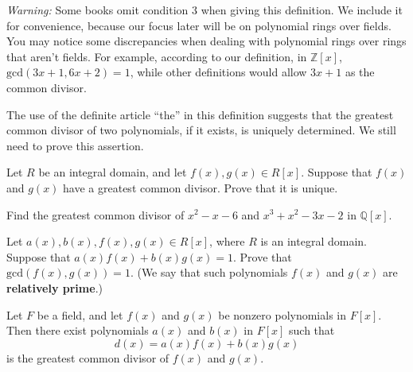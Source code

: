 \emph{Warning:} Some books omit condition 3 when giving this definition. We include it for convenience, because our focus later will be on polynomial rings over fields. You may notice some discrepancies when dealing with polynomial rings over rings that aren't fields. For example, according to our definition, in \(\mathbb{Z}[x]\), \(\text{gcd}(3x+1, 6x+2) = 1\), while other definitions would allow \(3x+1\) as the common divisor.

The use of the definite article ``the'' in this definition suggests that the greatest common divisor of two polynomials, if it exists, is uniquely determined. We still need to prove this assertion.

\begin{problem}
Let \(R\) be an integral domain, and let \(f(x),g(x)\in R[x]\). Suppose that \(f(x)\) and \(g(x)\) have a greatest common divisor.  Prove that it is unique.
\end{problem}

\begin{problem}
Find the greatest common divisor of \(x^2-x-6\) and \(x^3+x^2-3x-2\) in \(\mathbb{Q}[x]\).
\end{problem}

\begin{problem}\label{prob:relprimegcd}
Let \(a(x), b(x), f(x), g(x) \in R[x]\), where \(R\) is an integral domain. Suppose that \(a(x)f(x)+b(x)g(x) = 1\). Prove that \(\mbox{gcd}(f(x),g(x))=1\). (We say that such polynomials \(f(x)\) and \(g(x)\) are \textbf{relatively prime}.)
\begin{annotation}
\end{annotation}
\end{problem}

\begin{theorem}\label{thm:gcdlincomb}
Let \(F\) be a field, and let \(f(x)\) and \(g(x)\) be nonzero polynomials in \(F[x]\). Then there exist polynomials \(a(x)\) and \(b(x)\) in \(F[x]\) such that \[d(x) = a(x)f(x) + b(x)g(x)\]
is the greatest common divisor of \(f(x)\) and \(g(x)\).
\begin{annotation}
\end{annotation}
\end{theorem}

